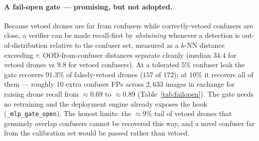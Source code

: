 \paragraph{A fail-open gate --- promising, but not adopted.}
Because vetoed drones are far from confusers while correctly-vetoed confusers are close, a verifier can be made recall-first by \emph{abstaining} whenever a detection is out-of-distribution relative to the confuser set, measured as a $k$-NN distance exceeding $\tau$. OOD-from-confuser distances separate cleanly (median $34.4$ for vetoed drones vs $9.8$ for vetoed confusers). At a tolerated $5\%$ confuser leak the gate recovers $91.3\%$ of falsely-vetoed drones ($157$ of $172$); at $10\%$ it recovers all of them --- roughly $10$ extra confuser FPs across $2{,}633$ images in exchange for raising drone recall from ${\approx}0.69$ to ${\approx}0.89$ (Table~\ref{tab:failopen}). The gate needs no retraining and the deployment engine already exposes the hook (\texttt{\_mlp\_gate\_open}). The honest limits: the ${\approx}9\%$ tail of vetoed drones that genuinely overlap confusers cannot be recovered this way, and a novel confuser far from the calibration set would be passed rather than vetoed.

